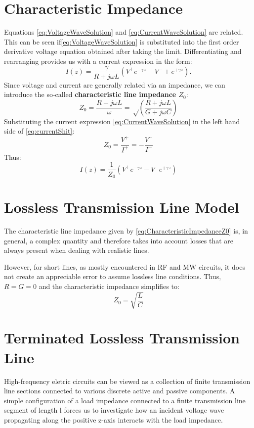 \documentclass{article}
\begin{document}
\section{Characteristic Impedance}
Equations \ref{eq:VoltageWaveSolution} and \ref{eq:CurrentWaveSolution} are related. This can be seen if\ref{eq:VoltageWaveSolution} is substituted into the first order derivative voltage equation obtained after taking the limit. Differentiating and rearranging provides us with a current expression in the form:
\begin{equation}
  I(z)=\frac{\gamma}{R+j\omega L}(V^+ e^{-\gamma z} - V^- + e^{+\gamma z}).
  \label{eq:currentShit}
\end{equation}
Since voltage and current are generally related via an impedance, we can introduce the so-called \textbf{characteristic line impedance \(Z_0\)}:
\begin{equation}
   Z_0=\frac{R+j\omega L}{\omega}=\sqrt\left(\frac{R+j\omega L}{G+j\omega C}\right)
  \label{eq:CharacteristicImpedanceZ0}
\end{equation}
Substituting the current expression \ref{eq:CurrentWaveSolution} in the left hand side of \ref{eq:currentShit}:
\begin{equation}
    Z_0=\frac{V^+}{I^+}=-\frac{V^-}{I^-}
  \label{eq:}
\end{equation}
Thus:
\begin{equation}
  I(z)=\frac{1}{Z_0}(V^+ e^{-\gamma z}-V^- e^{+\gamma z})
  \label{eq:}
\end{equation}

\section{Lossless Transmission Line Model}
The characteristic line impedance given by \ref{eq:CharacteristicImpedanceZ0} is, in general, a complex quantity and therefore takes into account losses that are always present when dealing with realistic lines.

However, for short lines, as mostly encountered in RF and MW circuits, it does not create an appreciable error to assume lossless line conditions. Thus, \(R=G=0\) and the characteristic impedance simplifies to:
\begin{equation}
  Z_0=\sqrt{\frac{L}{C}}
  \label{eq:}
\end{equation}

\section{Terminated Lossless Transmission Line}
High-frequency eletric circuits can be viewed as a collection of finite transmission line sections connected to various discrete active and passive components.
A simple configuration of a load impedance connected to a finite transmission line segment of length l forces us to investigate how an incident voltage wave propagating along the positive z-axis interacts with the load impedance.
\vspace{5cm}
\end{document}
